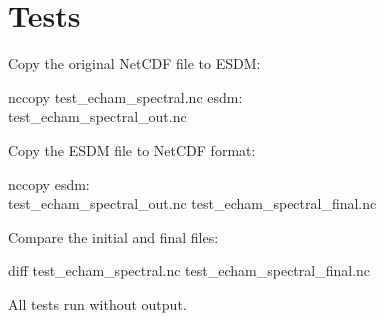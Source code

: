 \section{Tests}

\tab
Copy the original NetCDF file to ESDM:

\begin{framed}
nccopy test\_echam\_spectral.nc esdm:\\test\_echam\_spectral\_out.nc
\end{framed}

Copy the ESDM file to NetCDF format:

\begin{framed}
nccopy esdm:\\test\_echam\_spectral\_out.nc test\_echam\_spectral\_final.nc
\end{framed}

Compare the initial and final files:

\begin{framed}
diff test\_echam\_spectral.nc test\_echam\_spectral\_final.nc
\end{framed}

All tests run without output.

